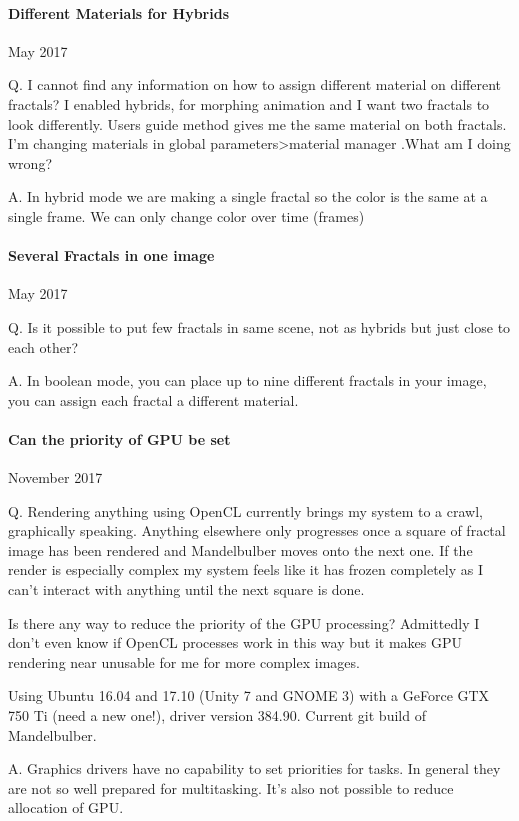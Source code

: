 \paragraph{Different Materials for Hybrids} May 2017

Q. I cannot find any information on how to assign different material on different fractals? I enabled hybrids, for morphing animation and I want two fractals to look differently. Users guide method gives me the same material on both fractals. I'm changing materials in global parameters>material manager .What am I doing wrong?

A. In hybrid mode we are making a single fractal so the color is the same at a single frame. We can only change color over time (frames)

\paragraph{Several Fractals in one image} May 2017

Q.  Is it possible to put few fractals in same scene, not as hybrids but just close to each other?

A. In  boolean mode, you can place up to nine different fractals in your image, you can assign each fractal a different material.

\paragraph{Can the priority of GPU be set} November 2017

Q. Rendering anything using OpenCL currently brings my system to a crawl, graphically speaking. Anything elsewhere only progresses once a square of fractal image has been rendered and Mandelbulber moves onto the next one. If the render is especially complex my system feels like it has frozen completely as I can't interact with anything until the next square is done.

Is there any way to reduce the priority of the GPU processing? Admittedly I don't even know if OpenCL processes work in this way but it makes GPU rendering near unusable for me for more complex images.

Using Ubuntu 16.04 and 17.10 (Unity 7 and GNOME 3) with a GeForce GTX 750 Ti (need a new one!), driver version 384.90. Current git build of Mandelbulber.

A. Graphics drivers have no capability to set priorities for tasks. In general they are not so well prepared for multitasking. It's also not possible to reduce allocation of GPU. 

